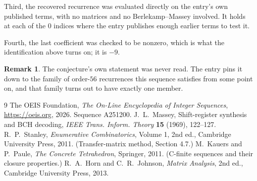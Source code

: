 \documentclass[11pt,a4paper]{article}
\theoremstyle{plain}
\theoremstyle{definition}
\newtheorem{remark}[theorem]{Remark}
\begin{document}
Third, the recovered recurrence was evaluated directly on the entry's own published terms, with
no matrices and no Berlekamp--Massey involved. It holds at each of the $0$ indices where
the entry publishes enough earlier terms to test it.

Fourth, the last coefficient was checked to be nonzero, which is what the identification above
turns on; it is $-9$.

\begin{remark}
The conjecture's own statement was never read. The entry pins it down to the family of
order-$56$ recurrences this sequence satisfies from some point on, and that family turns
out to have exactly one member.
\end{remark}

\begin{thebibliography}{9}
 The OEIS Foundation, \emph{The On-Line Encyclopedia of Integer
Sequences}, \url{https://oeis.org}, 2026. Sequence A251200.
 J.~L.~Massey, Shift-register synthesis and BCH decoding, \emph{IEEE
Trans. Inform. Theory} \textbf{15} (1969), 122--127.
 R.~P.~Stanley, \emph{Enumerative Combinatorics}, Volume 1, 2nd ed.,
Cambridge University Press, 2011. (Transfer-matrix method, Section 4.7.)
 M.~Kauers and P.~Paule, \emph{The Concrete Tetrahedron}, Springer, 2011.
(C-finite sequences and their closure properties.)
 R.~A.~Horn and C.~R.~Johnson, \emph{Matrix Analysis}, 2nd ed., Cambridge
University Press, 2013.
\end{thebibliography}
\end{document}
